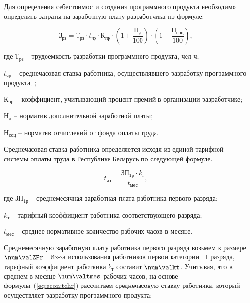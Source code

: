 Для определения себестоимости создания программного продукта необходимо определить затраты
на заработную плату разработчика по формуле:

\begin{equation}
  \label{eq:econ:Zrz}
  \text{З}_{\text{рз}} =
  \text{Т}_{\text{рз}} \cdot
  t_{\text{чр}} \cdot
  \text{К}_{\text{пр}} \cdot
  \left(\text{1} + \frac{\text{Н}_{\text{д}}}{\text{100}}\right) \cdot
  \left(\text{1} + \frac{\text{Н}_{\text{соц}}}{\text{100}}\right),
\end{equation}
\begin{explanationx}
  \item[где] $ \text{Т}_\text{рз} $ -- трудоемкость разработки программного продукта, чел-ч;
  \item $ t_\text{чр} $ -- среднечасовая ставка работника, осуществлявшего разработку программного продукта, \rub;
  \item $ \text{К}_\text{пр} $ -- коэффициент, учитывающий процент премий
    в организации-раз\-ра\-бот\-чи\-ке;
  \item $ \text{Н}_\text{д} $ -- норматив дополнительной заработной платы;
  \item $ \text{Н}_\text{соц} $ -- норматив отчислений от фонда оплаты труда.
\end{explanationx}

Среднечасовая ставка работника определяется исходя из единой тарифной системы оплаты труда
в Республике Беларусь по следующей формуле:

\begin{equation}
  \label{eq:econ:tchr}
  t_\text{чр} = \frac{\text{ЗП}_\text{1р} \cdot k_\text{т}}{t_\text{мес}},
\end{equation}
\begin{explanationx}
  \item[где] $ \text{ЗП}_\text{1р} $ -- среднемесячная заработная плата работника первого разряда;
  \item $ k_\text{т} $ -- тарифный коэффициент работника соответствующего разряда;
  \item $ t_\text{мес} $ -- среднее нормативное количество рабочих часов в месяце.
\end{explanationx}

Среднемесячную заработную плату работника первого разряда возьмем в размере $ \num\valZPr $ \rub.
Из-за использования работников первой категории 11 разряда, тарифный коэффициент работника
$ k_\text{т} $ составит $ \num\valkt $. Учитывая, что в среднем в месяце $ \num\valtmes $
рабочих часов, на основе формулы~(\ref{eq:econ:tchr}) рассчитаем среднечасовую ставку работника,
который осуществляет разработку программного продукта:

